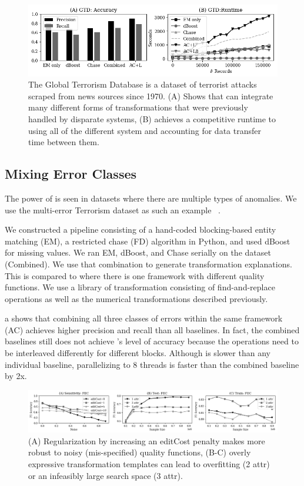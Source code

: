 \begin{figure}[ht]
    \centering
    \includegraphics[width=\columnwidth]{exp/exp7.png}
    \caption{The Global Terrorism Database is a dataset of terrorist attacks scraped from news sources since 1970. (A) Shows that \sys can integrate many different forms of transformations that were previously handled by disparate systems, (B) \sys achieves a competitive runtime to using all of the different system and accounting for data transfer time between them. \label{exp7a}}
\end{figure}

\subsection{Mixing Error Classes}\label{s:expterror}
The power of \sys is seen in datasets where there are multiple types of anomalies.
We use the multi-error Terrorism dataset as such an example ~\cite{data-terrorism}. 

 We constructed a pipeline consisting of a hand-coded blocking-based entity matching (EM), a restricted chase (FD) algorithm in Python, and used dBoost for missing values.  We ran EM, dBoost, and Chase serially on the dataset (Combined). We use that combination to generate transformation explanations.
This is compared to \sys where there is one framework with different quality functions. We use a library of transformation consisting of find-and-replace operations as well as the numerical transformations described previously.


 a shows that combining  all three classes of errors within the same \sys framework (AC) achieves higher precision and recall than all baselines.  In fact, the combined baselines still does not achieve \sys's level of accuracy because the  operations need to be interleaved differently for different blocks.   Although \sys is slower than any individual baseline, parallelizing \sys to 8 threads is faster than the combined baseline by 2x. 


 \begin{figure}[t]
\centering
 \includegraphics[width=\textwidth]{exp/exp5.png}
 \caption{\small (A) Regularization by increasing an editCost penalty makes \sys more robust to noisy (mis-specified) quality functions, (B-C) overly expressive transformation templates can lead to overfitting (2 attr) or an infeasibly large search space (3 attr).  
 \label{fig:sensitivity}}
\end{figure}

